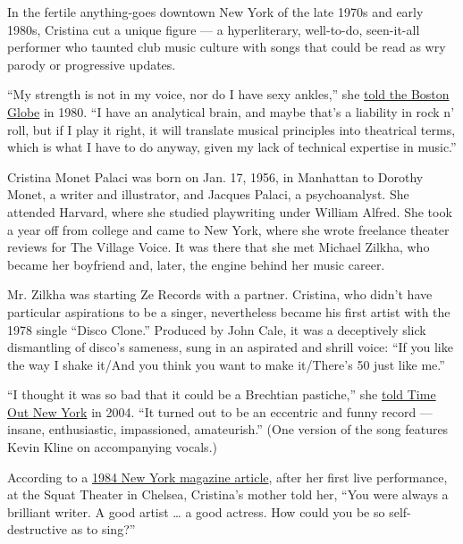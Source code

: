 In the fertile anything-goes downtown New York of the late 1970s and
early 1980s, Cristina cut a unique figure --- a hyperliterary,
well-to-do, seen-it-all performer who taunted club music culture with
songs that could be read as wry parody or progressive updates.

``My strength is not in my voice, nor do I have sexy ankles,'' she
\href{https://www.redoverwhite.org/cristina/rocks_cristina.html}{told
the Boston Globe} in 1980. ``I have an analytical brain, and maybe
that's a liability in rock n' roll, but if I play it right, it will
translate musical principles into theatrical terms, which is what I have
to do anyway, given my lack of technical expertise in music.''

Cristina Monet Palaci was born on Jan. 17, 1956, in Manhattan to Dorothy
Monet, a writer and illustrator, and Jacques Palaci, a psychoanalyst.
She attended Harvard, where she studied playwriting under William
Alfred. She took a year off from college and came to New York, where she
wrote freelance theater reviews for The Village Voice. It was there that
she met Michael Zilkha, who became her boyfriend and, later, the engine
behind her music career.

Mr. Zilkha was starting Ze Records with a partner. Cristina, who didn't
have particular aspirations to be a singer, nevertheless became his
first artist with the 1978 single ``Disco Clone.'' Produced by John
Cale, it was a deceptively slick dismantling of disco's sameness, sung
in an aspirated and shrill voice: ``If you like the way I shake it/And
you think you want to make it/There's 50 just like me.''

``I thought it was so bad that it could be a Brechtian pastiche,'' she
\href{https://www.redoverwhite.org/cristina/queen_cristina.html}{told
Time Out New York} in 2004. ``It turned out to be an eccentric and funny
record --- insane, enthusiastic, impassioned, amateurish.'' (One version
of the song features Kevin Kline on accompanying vocals.)

According to a
\href{https://books.google.com/books?id=C-YCAAAAMBAJ\&pg=PA54\&lpg=PA54\&dq=Harvard+\%22Cristina+Monet\%22\&source=bl\&ots=DyhnXwdtrl\&sig=ACfU3U06gcTYJ9qThF562RojNY1vXS4gEA\&hl=en\&ppis=_c\&sa=X\&ved=2ahUKEwj2io3oxsjoAhVMlnIEHfdNAtYQ6AEwCHoECD8QKA\#v=onepage\&q=Monet\%22\&f=false}{1984
New York magazine article}, after her first live performance, at the
Squat Theater in Chelsea, Cristina's mother told her, ``You were always
a brilliant writer. A good artist \ldots{} a good actress. How could you
be so self-destructive as to sing?''

